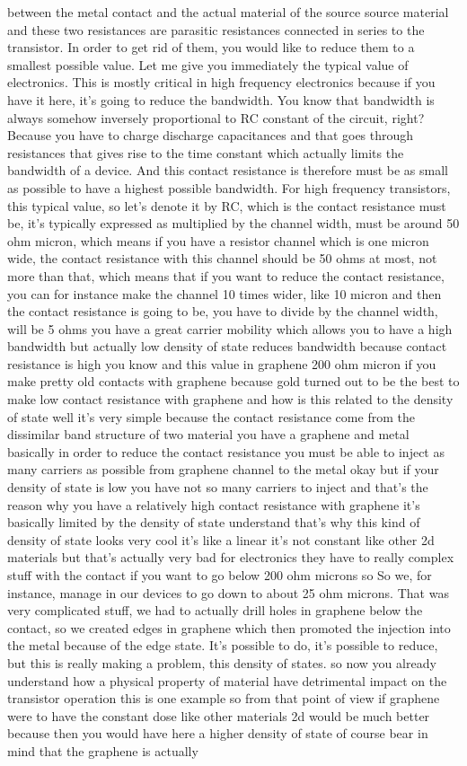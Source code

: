 between the metal contact and the actual material of the source source material and these two resistances are parasitic resistances connected in series to the transistor. In order to get rid of them, you would like to reduce them to a smallest possible value. Let me give you immediately the typical value of electronics. This is mostly critical in high frequency electronics because if you have it here, it's going to reduce the bandwidth. You know that bandwidth is always somehow inversely proportional to RC constant of the circuit, right? Because you have to charge discharge capacitances and that goes through resistances that gives rise to the time constant which actually limits the bandwidth of a device. And this contact resistance is therefore must be as small as possible to have a highest possible bandwidth. For high frequency transistors, this typical value, so let's denote it by RC, which is the contact resistance must be, it's typically expressed as multiplied by the channel width, must be around 50 ohm micron, which means if you have a resistor channel which is one micron wide, the contact resistance with this channel should be 50 ohms at most, not more than that, which means that if you want to reduce the contact resistance, you can for instance make the channel 10 times wider, like 10 micron and then the contact resistance is going to be, you have to divide by the channel width, will be 5 ohms you have a great carrier mobility which allows you to have a high bandwidth but actually low density of state reduces bandwidth because contact resistance is high you know and this value in graphene 200 ohm micron if you make pretty old contacts with graphene because gold turned out to be the best to make low contact resistance with graphene and how is this related to the density of state well it's very simple because the contact resistance come from the dissimilar band structure of two material you have a graphene and metal basically in order to reduce the contact resistance you must be able to inject as many carriers as possible from graphene channel to the metal okay but if your density of state is low you have not so many carriers to inject and that's the reason why you have a relatively high contact resistance with graphene it's basically limited by the density of state understand that's why this kind of density of state looks very cool it's like a linear it's not constant like other 2d materials but that's actually very bad for electronics they have to really complex stuff with the contact if you want to go below 200 ohm microns so So we, for instance, manage in our devices to go down to about 25 ohm microns. That was very complicated stuff, we had to actually drill holes in graphene below the contact, so we created edges in graphene which then promoted the injection into the metal because of the edge state. It's possible to do, it's possible to reduce, but this is really making a problem, this density of states. so now you already understand how a physical property of material have detrimental impact on the transistor operation this is one example so from that point of view if graphene were to have the constant dose like other materials 2d would be much better because then you would have here a higher density of state of course bear in mind that the graphene is actually 